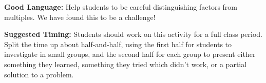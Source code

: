 \documentclass[nooutcomes,noauthor,handout]{ximera}
\begin{document}
\begin{instructorNotes}
{\bf Good Language:} Help students to be careful distinguishing factors from multiples. We have found this to be a challenge!



{\bf Suggested Timing:} Students should work on this activity for a full class period. Split the time up about half-and-half, using the first half for students to investigate in small groups, and the second half for each group to present either something they learned, something they tried which didn't work, or a partial solution to a problem.

\end{instructorNotes}
\end{document}
